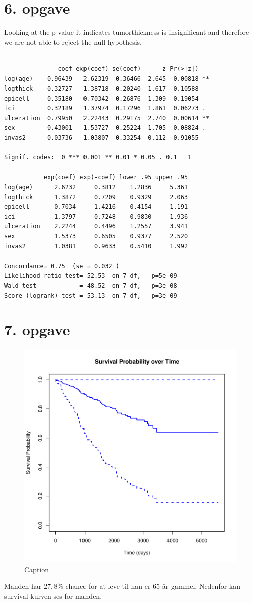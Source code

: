 \chapter{6. opgave}
Looking at the p-value it indicates tumorthickness is insignificant and therefore we are not able to reject the null-hypothesis.
\begin{lstlisting}
    
               coef exp(coef) se(coef)      z Pr(>|z|)   
log(age)    0.96439   2.62319  0.36466  2.645  0.00818 **
logthick    0.32727   1.38718  0.20240  1.617  0.10588   
epicell    -0.35180   0.70342  0.26876 -1.309  0.19054   
ici         0.32189   1.37974  0.17296  1.861  0.06273 . 
ulceration  0.79950   2.22443  0.29175  2.740  0.00614 **
sex         0.43001   1.53727  0.25224  1.705  0.08824 . 
invas2      0.03736   1.03807  0.33254  0.112  0.91055   
---
Signif. codes:  0 *** 0.001 ** 0.01 * 0.05 . 0.1   1

           exp(coef) exp(-coef) lower .95 upper .95
log(age)      2.6232     0.3812    1.2836     5.361
logthick      1.3872     0.7209    0.9329     2.063
epicell       0.7034     1.4216    0.4154     1.191
ici           1.3797     0.7248    0.9830     1.936
ulceration    2.2244     0.4496    1.2557     3.941
sex           1.5373     0.6505    0.9377     2.520
invas2        1.0381     0.9633    0.5410     1.992

Concordance= 0.75  (se = 0.032 )
Likelihood ratio test= 52.53  on 7 df,   p=5e-09
Wald test            = 48.52  on 7 df,   p=3e-08
Score (logrank) test = 53.13  on 7 df,   p=3e-09
\end{lstlisting}

\chapter{7. opgave}
\begin{figure}[h]
    \centering
    \includegraphics[width=0.5\linewidth]{Basses_kode/Billeder_duration/survival_curve_man_57.pdf}
    \caption{Caption}
\end{figure}
\noindent Manden har $27,8\%$ chance for at leve til han er 65 år gammel. 
Nedenfor kan survival kurven ses for manden.


